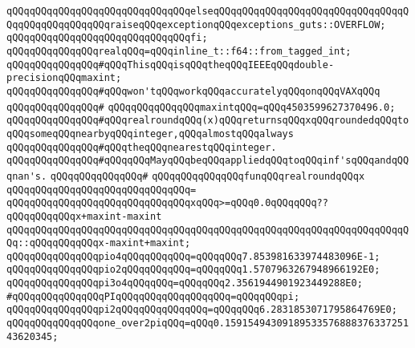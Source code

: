 \verb|qQQqqQQqqQQqqQQqqQQqqQQqqQQqqQQqelseqQQqqQQqqQQqqQQqqQQqqQQqqQQqqQQqqQQqqQQqqQQqqQQqqQQqraiseqQQqexceptionqQQqexceptions_guts::OVERFLOW;|\newline
\verb|qQQqqQQqqQQqqQQqqQQqqQQqqQQqqQQqfi;|\newline
\newline
\verb|qQQqqQQqqQQqqQQqrealqQQq=qQQqinline_t::f64::from_tagged_int;|\newline
\newline
\verb|qQQqqQQqqQQqqQQq#qQQqThisqQQqisqQQqtheqQQqIEEEqQQqdouble-precisionqQQqmaxint;|\newline
\verb|qQQqqQQqqQQqqQQq#qQQqwon'tqQQqworkqQQqaccuratelyqQQqonqQQqVAXqQQq|\newline
\verb|qQQqqQQqqQQqqQQq#|\newline
\verb|qQQqqQQqqQQqqQQqmaxintqQQq=qQQq4503599627370496.0;|\newline
\newline
\verb|qQQqqQQqqQQqqQQq#qQQqrealroundqQQq(x)qQQqreturnsqQQqxqQQqroundedqQQqtoqQQqsomeqQQqnearbyqQQqinteger,qQQqalmostqQQqalways|\newline
\verb|qQQqqQQqqQQqqQQq#qQQqtheqQQqnearestqQQqinteger.|\newline
\verb|qQQqqQQqqQQqqQQq#qQQqqQQqMayqQQqbeqQQqappliedqQQqtoqQQqinf'sqQQqandqQQqnan's.|\newline
\verb|qQQqqQQqqQQqqQQq#|\newline
\verb|qQQqqQQqqQQqqQQqfunqQQqrealroundqQQqx|\newline
\verb|qQQqqQQqqQQqqQQqqQQqqQQqqQQqqQQq=|\newline
\verb|qQQqqQQqqQQqqQQqqQQqqQQqqQQqqQQqxqQQq>=qQQq0.0qQQqqQQq??qQQqqQQqqQQqx+maxint-maxint|\newline
\verb|qQQqqQQqqQQqqQQqqQQqqQQqqQQqqQQqqQQqqQQqqQQqqQQqqQQqqQQqqQQqqQQqqQQqqQQq::qQQqqQQqqQQqx-maxint+maxint;|\newline
\newline
\verb|qQQqqQQqqQQqqQQqpio4qQQqqQQqqQQq=qQQqqQQq7.853981633974483096E-1;|\newline
\verb|qQQqqQQqqQQqqQQqpio2qQQqqQQqqQQq=qQQqqQQq1.5707963267948966192E0;|\newline
\verb|qQQqqQQqqQQqqQQqpi3o4qQQqqQQq=qQQqqQQq2.3561944901923449288E0;|\newline
\verb|#qQQqqQQqqQQqqQQqPIqQQqqQQqqQQqqQQqqQQq=qQQqqQQqpi;|\newline
\verb|qQQqqQQqqQQqqQQqpi2qQQqqQQqqQQqqQQq=qQQqqQQq6.2831853071795864769E0;|\newline
\verb|qQQqqQQqqQQqqQQqone_over2piqQQq=qQQq0.1591549430918953357688837633725143620345;|\newline

